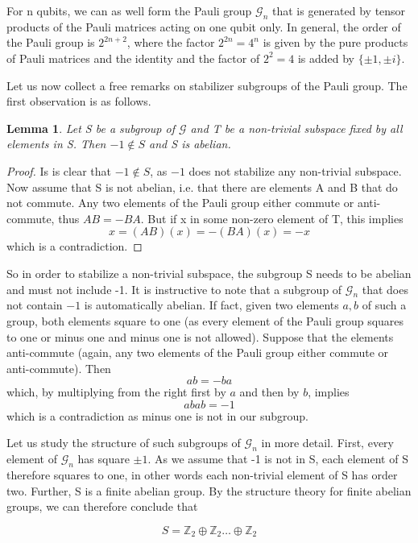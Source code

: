 \documentclass[a4paper, draft]{article}
\theoremstyle{own}
\newtheorem{lem}[thm]{Lemma}
\theoremstyle{remark}
\newcommand{\Z}{\mathbb{Z}}
\begin{document}
For n qubits, we can as well form the Pauli group $\mathcal{G}_n$ that is generated by tensor products of the Pauli matrices acting on one qubit only. In general, the order of the Pauli group is $2^{2n+2}$, where the factor $2^{2n} = 4^n$ is given by the pure products of Pauli matrices and the identity and the factor of $2^2 =4$ is added by $\{\pm 1, \pm i\}$. 

Let us now collect a free remarks on stabilizer subgroups of the Pauli group. The first observation is as follows.

\begin{lem}
Let S be a subgroup of $\mathcal{G}$ and T be a non-trivial subspace fixed by all elements in S. Then $-1 \notin S$ and S is abelian.
\end{lem}

\begin{proof}
Is is clear that $-1 \notin S$, as $-1$ does not stabilize any non-trivial subspace. Now assume that S is not abelian, i.e. that there are elements A and B that do not commute. Any two elements of the Pauli group either commute or anti-commute, thus $AB = - BA$. But if x in some non-zero element of T, this implies
$$
x = (AB)(x) = - (BA)(x) = - x
$$
which is a contradiction.
\end{proof}
	
	
So in order to stabilize a non-trivial subspace, the subgroup S needs to be abelian and must not include -1. It is instructive to note that a subgroup of $\mathcal{G}_n$ that does not contain $-1$ is automatically abelian. If fact, given two elements $a, b$ of such a group, both elements square to one (as every element of the Pauli group squares to one or minus one and minus one is not allowed). Suppose that the elements anti-commute (again, any two elements of the Pauli group either commute or anti-commute). Then
$$
ab = -ba
$$
which, by multiplying from the right first by $a$ and then by $b$, implies
$$
abab = -1
$$
which is a contradiction as minus one is not in our subgroup.

Let us study the structure of such subgroups of $\mathcal{G}_n$ in more detail. First, every element of $\mathcal{G}_n$ has square $\pm 1$. As we assume that -1 is not in S, each element of S therefore squares to one, in other words each non-trivial element of S has order two. Further, S is a finite abelian group. By the structure theory for finite abelian groups, we can therefore conclude that 

$$
S = {\Z}_2  \oplus \Z_2 \dots \oplus \Z_2
$$
\end{document}
